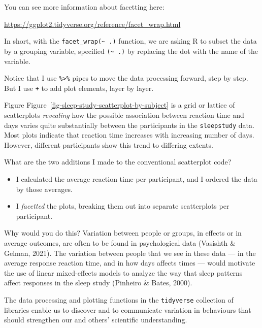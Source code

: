 \documentclass[
  letterpaper,
  DIV=11,
  numbers=noendperiod]{scrreprt}
\providecommand{\tightlist}{%
  \setlength{\itemsep}{0pt}\setlength{\parskip}{0pt}}\usepackage{longtable,booktabs,array}
\begin{document}
You can see more information about facetting here:

\url{https://ggplot2.tidyverse.org/reference/facet_wrap.html}

In short, with the \texttt{facet\_wrap(\textasciitilde{}\ .)} function,
we are asking R to subset the data by a grouping variable, specified
\texttt{(\textasciitilde{}\ .)} by replacing the dot with the name of
the variable.

Notice that I use \texttt{\%\textgreater{}\%} pipes to move the data
processing forward, step by step. But I use \texttt{+} to add plot
elements, layer by layer.

Figure Figure~\ref{fig-sleep-study-scatterplot-by-subject} is a grid or
lattice of scatterplots \emph{revealing} how the possible association
between reaction time and days varies quite substantially between the
participants in the \texttt{sleepstudy} data. Most plots indicate that
reaction time increases with increasing number of days. However,
different participants show this trend to differing extents.

What are the two additions I made to the conventional scatterplot code?

\begin{itemize}
\tightlist
\item
  I calculated the average reaction time per participant, and I ordered
  the data by those averages.
\item
  I \emph{facetted} the plots, breaking them out into separate
  scatterplots per participant.
\end{itemize}

Why would you do this? Variation between people or groups, in effects or
in average outcomes, are often to be found in psychological data
(Vasishth \& Gelman, 2021). The variation between people that we see in
these data --- in the average response reaction time, and in how days
affects times --- would motivate the use of linear mixed-effects models
to analyze the way that sleep patterns affect responses in the sleep
study (Pinheiro \& Bates, 2000).

\begin{tcolorbox}[enhanced jigsaw, opacitybacktitle=0.6, title=\textcolor{quarto-callout-tip-color}{\faLightbulb}\hspace{0.5em}{Tip}, arc=.35mm, colbacktitle=quarto-callout-tip-color!10!white, colframe=quarto-callout-tip-color-frame, leftrule=.75mm, opacityback=0, breakable, titlerule=0mm, left=2mm, bottomrule=.15mm, toprule=.15mm, colback=white, coltitle=black, bottomtitle=1mm, toptitle=1mm, rightrule=.15mm]

The data processing and plotting functions in the \texttt{tidyverse}
collection of libraries enable us to discover and to communicate
variation in behaviours that should strengthen our and others'
scientific understanding.

\end{tcolorbox}
\end{document}
